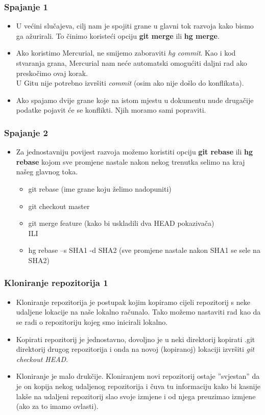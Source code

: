 \documentclass{beamer}
\begin{document}
	\begin{frame}
		\frametitle{Spajanje 1}
		\begin{itemize}
			\item U većini slučajeva, cilj nam je spojiti grane u glavni tok razvoja kako bismo ga ažurirali. To činimo koristeći opciju \textbf{git merge} ili \textbf{hg merge}.
			\item Ako koristimo Mercurial, ne smijemo zaboraviti \textit{hg commit}. Kao i kod stvaranja grana, Mercurial nam neće automatski omogućiti daljni rad ako preskočimo ovaj korak. \\ U Gitu nije potrebno izvršiti \textit{commit} (osim ako nije došlo do konflikata).
			\item Ako spajamo dvije grane koje na istom mjestu u dokumentu nude drugačije podatke pojavit će se konflikti. Njih moramo sami popraviti.
		\end{itemize}
	\end{frame}

	\begin{frame}
		\frametitle{Spajanje 2}
		\begin{itemize}
			\item Za jednostavniju povijest razvoja možemo koristiti opciju \textbf{git rebase} ili \textbf{hg rebase} kojom sve promjene nastale nakon nekog trenutka selimo na kraj našeg glavnog toka.
			\begin{itemize}
				\item git rebase (ime grane koju želimo nadopuniti)
 				\item git checkout master
				\item git merge feature (kako bi uskladili dva HEAD pokazivača)
				\\ILI
				\item hg rebase –s SHA1 -d SHA2 (sve promjene nastale nakon SHA1 se sele na SHA2)
			\end{itemize}
		\end{itemize}
	\end{frame}
	
	\begin{frame}
		\frametitle{Kloniranje repozitorija 1}
		\begin{itemize}
			\item Kloniranje repozitorija je postupak kojim kopiramo cijeli repozitorij s neke udaljene lokacije na naše lokalno računalo. Tako možemo nastaviti rad kao da se radi o repozitoriju kojeg smo inicirali lokalno.
			\item Kopirati repozitorij je jednostavno, dovoljno je u neki direktorij kopirati .git direktorij drugog repozitorija i onda na novoj (kopiranoj) lokaciji izvršiti \textit{git checkout HEAD}.
			\item Kloniranje je malo drukčije. Kloniranjem novi repozitorij ostaje ”svjestan” da je on kopija nekog udaljenog repozitorija i čuva tu informaciju kako bi kasnije lakše na udaljeni repozitorij slao svoje izmjene i od njega preuzimao izmjene (ako za to imamo ovlasti).
		\end{itemize}
	\end{frame}
	
\end{document}
